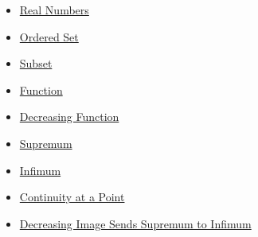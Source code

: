\begin{dependencies}
\begin{itemize}
  \item \hyperref[def:reals]{Real Numbers}
  \item \hyperref[def:ordered-set]{Ordered Set}
  \item \hyperref[def:subset]{Subset}
  \item \hyperref[def:function]{Function}
  \item \hyperref[def:function-decreasing]{Decreasing Function}
  \item \hyperref[def:supremum]{Supremum}
  \item \hyperref[def:infimum]{Infimum}
  \item \hyperref[def:continuous-at-point]{Continuity at a Point}
  \item \hyperref[thm:decreasing-image-supremum-to-infimum]{Decreasing Image Sends Supremum to Infimum}
\end{itemize}
\end{dependencies}
